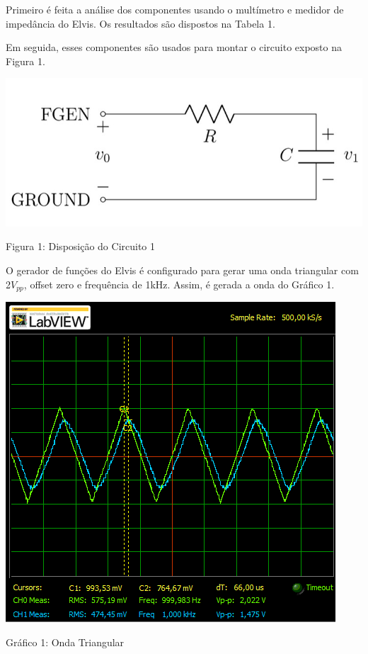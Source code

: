 \parag Primeiro é feita a análise dos componentes usando o multímetro e medidor de impedância do Elvis. Os resultados são dispostos na Tabela 1.



Em seguida, esses componentes são usados para montar o circuito exposto na Figura 1.

\begin{table}[h]
\centering
\includegraphics[scale=0.4]{figuras/figura1}
\end{table}
\begin{center}
Figura 1: Disposição do Circuito 1
\end{center}

O gerador de funções do Elvis é configurado para gerar uma onda triangular com 2$V_{pp}$, offset zero e frequência de 1kHz. Assim, é gerada a onda do Gráfico 1.

\begin{table}[h]
\centering
\includegraphics[scale=0.8]{graficos/rgadicoa1-triangulo}
\end{table}
\begin{center}
Gráfico 1: Onda Triangular
\end{center}

